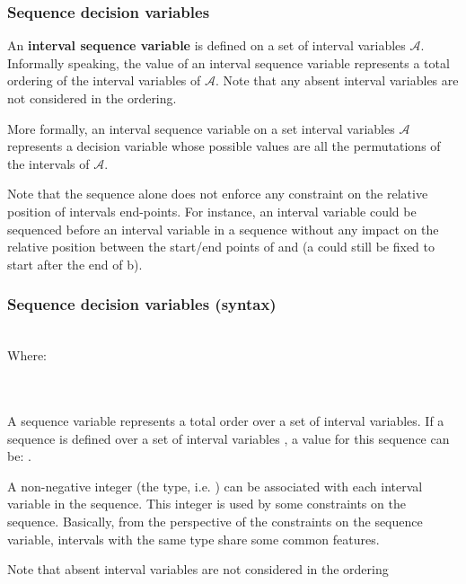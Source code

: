 \begin{frame} \frametitle{Sequence decision variables}

An \textbf{interval sequence variable} is defined on a set of interval variables $\mathcal{A}$. Informally speaking, the value of an interval sequence variable represents a total ordering of the interval variables of $\mathcal{A}$. Note that any absent interval variables are not considered in the ordering.
 
\pause\medskip

More formally, an interval sequence variable  on a set interval variables $\mathcal{A}$ represents a decision variable whose possible values are all the permutations of the intervals of $\mathcal{A}$.

\pause\medskip

Note that the sequence alone does not enforce any constraint on the relative position of intervals end-points. For instance, an interval variable  could be sequenced before an interval variable  in a sequence  without any impact on the relative position between the start/end points of  and  (a could still be fixed to start after the end of b).

\end{frame}



\begin{frame} \frametitle{Sequence decision variables (syntax)}
\pause

\\
Where:\\
\\
\\

\pause\medskip

A sequence variable represents a total order over a set of interval variables. If a sequence  is defined over a set of interval variables , a value for this sequence can be: .

\pause\medskip

A non-negative integer (the type, i.e. ) can be associated with each interval variable in the sequence. This integer is used by some constraints on the sequence. Basically, from the perspective of the constraints on the sequence variable, intervals with the same type share some common features.

\pause\medskip

Note that absent interval variables are not considered in the ordering

\end{frame}

